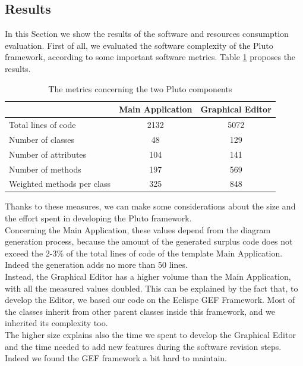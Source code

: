 \subsection{Results}
\label{metricsResult}

In this Section we show the results of the software and resources consumption evaluation.
First of all, we evaluated the software complexity of the Pluto framework, according to some important software metrics. Table \ref{table:metricsTable} proposes the results.

\begin{table}[htdp]
\centering
\begin{tabular}{|l|c|c|}
\hline
& Main Application & Graphical Editor \\
\hline
Total lines of code & 2132 & 5072 \\
\hline
Number of classes & 48 & 129 \\
\hline
Number of attributes & 104 & 141 \\
\hline
Number of methods & 197 & 569 \\
\hline
Weighted methods per class & 325 & 848 \\
\hline
\end{tabular}
\caption{The metrics concerning the two Pluto components}
\label{table:metricsTable}
\end{table}

Thanks to these measures, we can make some considerations about the size and the effort	spent in developing the Pluto framework.
\\
Concerning the Main Application, these values depend from the diagram generation process, because the amount of the generated surplus code does not exceed the 2-3\% of the total lines of code of the template Main Application.
Indeed the generation adds no more than 50 lines.
\\
Instead, the Graphical Editor has a higher volume than the Main Application, with all the measured values doubled. 
This can be explained by the fact that, to develop the Editor, we based our code on the Eclispe GEF Framework.
Most of the classes inherit from other parent classes inside this framework, and we inherited its complexity too.
\\
The higher size explains also the time we spent to develop the Graphical Editor and the time needed to add new features during the software revision steps.
Indeed we found the GEF framework a bit hard to maintain.
\\

